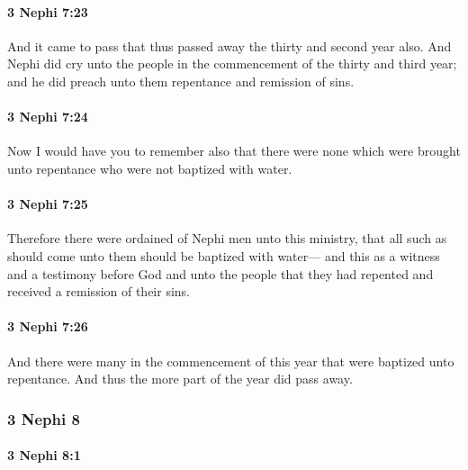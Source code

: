 		\paragraph{3 Nephi 7:23} %
			\label{3NEPHI-7-23}

			And it came to pass that thus passed away the thirty and second year also.
			And Nephi did cry unto the people
			in the commencement of the thirty and third year;
			and he did preach unto them repentance and remission of sins.

		\paragraph{3 Nephi 7:24} %
			\label{3NEPHI-7-24}

			Now I would have you to remember also
			that there were none which were brought unto repentance
			who were not baptized with water.

		\paragraph{3 Nephi 7:25} %
			\label{3NEPHI-7-25}

			Therefore there were ordained of Nephi men unto this ministry,
			that all such as should come unto them should be baptized with water---
			and this as a witness and a testimony before God and unto the people
			that they had repented and received a remission of their sins.

		\paragraph{3 Nephi 7:26} %
			\label{3NEPHI-7-26}

			And there were many in the commencement of this year
			that were baptized unto repentance.
			And thus the more part of the year did pass away.

	\subsubsection{3 Nephi 8} %
		\label{3NEPHI-8}
		
		\paragraph{3 Nephi 8:1} %
			\label{3NEPHI-8-1}

